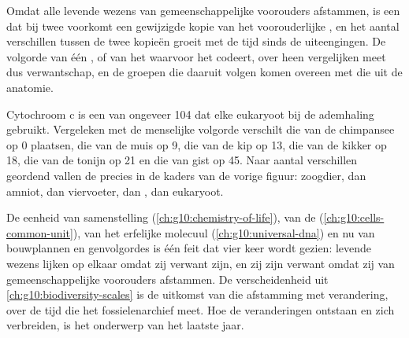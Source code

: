 \begin{proposition}\label{prop:g10:common-ancestry:molecular}
Omdat alle levende wezens van gemeenschappelijke voorouders afstammen,
is een  dat bij twee  voorkomt een gewijzigde kopie van het
voorouderlijke , en het aantal verschillen tussen de twee kopieën
groeit met de tijd sinds de  uiteengingen. De volgorde van één
, of van het  waarvoor het codeert, over  heen
vergelijken meet dus verwantschap, en de groepen die daaruit volgen
komen overeen met die uit de anatomie.
\end{proposition}
\admitted

\begin{example}[Cytochroom c]\label{ex:g10:common-ancestry:cytochrome}
Cytochroom c is een  van ongeveer 104  dat elke eukaryoot
bij de ademhaling gebruikt. Vergeleken met de menselijke volgorde
verschilt die van de chimpansee op 0 plaatsen, die van de muis op 9, die
van de kip op 13, die van de kikker op 18, die van de tonijn op 21 en
die van gist op 45. Naar aantal verschillen geordend vallen de 
precies in de kaders van de vorige figuur: zoogdier, dan amniot, dan
viervoeter, dan , dan eukaryoot.
\end{example}

\begin{remark}\label{rem:g10:common-ancestry:unity}
De eenheid van samenstelling (\cref{ch:g10:chemistry-of-life}), van de
 (\cref{ch:g10:cells-common-unit}), van het erfelijke molecuul
(\cref{ch:g10:universal-dna}) en nu van bouwplannen en genvolgordes is
één feit dat vier keer wordt gezien: levende wezens lijken op elkaar
omdat zij verwant zijn, en zij zijn verwant omdat zij van
gemeenschappelijke voorouders afstammen. De verscheidenheid uit
\cref{ch:g10:biodiversity-scales} is de uitkomst van die afstamming met
verandering, over de tijd die het fossielenarchief meet. Hoe de
veranderingen ontstaan en zich verbreiden, is het onderwerp van het
laatste jaar.
\end{remark}

